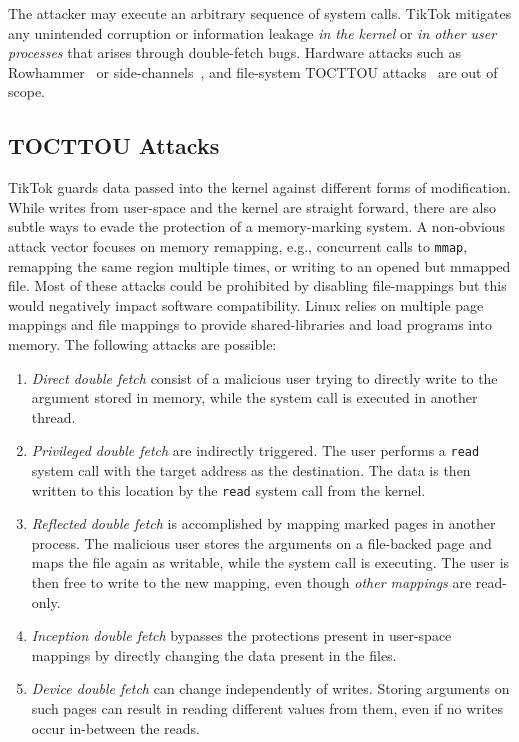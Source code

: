 \documentclass[conference]{IEEEtran}
\newcommand{\sysname}{TikTok}
\begin{document}
The attacker may execute an arbitrary sequence of system calls. \sysname{}
mitigates any unintended corruption or information leakage \emph{in the kernel}
or \emph{in other user processes} that arises through
double-fetch bugs. Hardware attacks such as Rowhammer~\cite{mutlu2019rowhammer}
or side-channels~\cite{kocher2019spectre}, and file-system TOCTTOU
attacks~\cite{payer2012protecting, pu2006methodical, wei2010modeling,
tsafrir2008portably} are out of scope.

\subsection{TOCTTOU Attacks}
\label{sec:attacks}

\sysname{} guards data passed into the kernel against different forms of
modification. While writes from user-space and the kernel are straight forward,
there are also subtle ways to evade the protection of a memory-marking system. 
A non-obvious attack vector focuses on memory remapping, e.g., concurrent calls
to \texttt{mmap}, remapping the same region multiple times, or writing to an
opened but mmapped file.
Most of these attacks could be prohibited by disabling file-mappings but this
would negatively impact software compatibility.
Linux relies on multiple page mappings and file mappings to provide shared-libraries and load
programs into memory.
The following attacks are possible:
\begin{enumerate}
  \item \label{first} \emph{Direct double fetch} consist of a malicious
  user trying to directly write to the argument stored in memory, while the
  system call is executed in another thread. 

  \item \label{second} \emph{Privileged double fetch} are indirectly triggered.
  The user performs a \texttt{read} system call with the target address as the
  destination. The data is then written to this location by the \texttt{read}
  system call from the kernel.

  \item \label{third} \emph{Reflected double fetch} is accomplished by
  mapping marked pages in another process. The malicious user stores the
  arguments on a file-backed page and maps the file again as writable, while the
  system call is executing. The user is then free to write to the new mapping,
  even though \emph{other mappings} are read-only. 

  \item \label{fourth} \emph{Inception double fetch}
  bypasses the protections present in user-space mappings by directly changing
  the data present in the files.

  \item \label{fifth} \emph{Device double fetch} can change
  independently of writes. Storing arguments on such pages can result in reading
  different values from them, even if no writes occur in-between the reads.

\end{enumerate}
\end{document}
